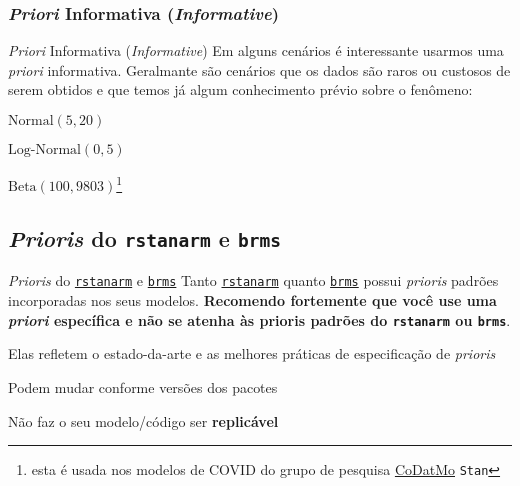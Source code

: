 \subsubsection{\textit{Priori} Informativa (\textit{Informative})}
\begin{frame}{\textit{Priori} Informativa (\textit{Informative})}
    Em alguns cenários é interessante usarmos uma \textit{priori} informativa.
    Geralmante são cenários que os dados são raros ou custosos de serem obtidos
    e que temos já algum conhecimento prévio sobre o fenômeno:
    \begin{vfilleditems}
        \item $\text{Normal}(5, 20)$
        \item $\text{Log-Normal}(0, 5)$
        \item $\text{Beta}(100, 9803)$\footnote{esta é usada nos modelos de COVID do grupo de pesquisa \href{https://codatmo.github.io}{CoDatMo} \texttt{Stan}}
    \end{vfilleditems}
\end{frame}

\subsection{\textit{Prioris} do \texttt{rstanarm} e \texttt{brms}}
\begin{frame}{\textit{Prioris} do \href{http://mc-stan.org/rstanarm/}{\texttt{rstanarm}} e \href{https://paul-buerkner.github.io/brms/}{\texttt{brms}}}
    Tanto \href{http://mc-stan.org/rstanarm/}{\texttt{rstanarm}}
    quanto \href{https://paul-buerkner.github.io/brms/}{\texttt{brms}} possui \textit{prioris}
    padrões incorporadas nos seus modelos.
    \vfill
    \textbf{Recomendo fortemente que você use uma \textit{priori} específica e não se atenha
    às prioris padrões do \texttt{rstanarm} ou \texttt{brms}}.
    \vfill
    \begin{vfilleditems}
        \item Elas refletem o estado-da-arte e as melhores práticas
        de especificação de \textit{prioris}
        \item Podem mudar conforme versões dos pacotes
        \item Não faz o seu modelo/código ser \textbf{replicável}
    \end{vfilleditems}
\end{frame}

